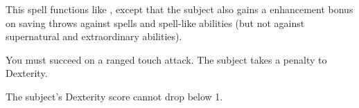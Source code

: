 \begin{spelleffect}
  This spell functions like , except that the subject also gains a  enhancement bonus on saving throws against spells and spell-like abilities (but not against supernatural and extraordinary abilities).
\end{spelleffect}

\begin{comment}
\subsubsection{Q-R}
\end{comment}

\spellrng{\rngclose}
\spelldur{\durshort}
\begin{spelleffect}
  You must succeed on a ranged touch attack. The subject takes a  penalty to Dexterity.
\end{spelleffect}
\begin{spellnotes}
  The subject's Dexterity score cannot drop below 1.
\end{spellnotes}

